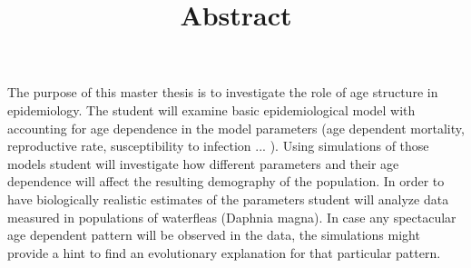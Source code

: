\documentclass{article}
\title{Abstract}
\begin{document}
\maketitle

The purpose of this master thesis is to investigate the role of age structure in epidemiology. The student will examine basic epidemiological model with accounting for age dependence in the model parameters (age dependent mortality, reproductive rate, susceptibility to infection ... ). Using simulations of those models student will investigate how different parameters and their age dependence will affect the resulting demography of the population. In order to have biologically realistic estimates of the parameters student will analyze data measured in populations of waterfleas (Daphnia magna). In case any spectacular age dependent pattern will be observed in the data, the simulations might provide a hint to find an evolutionary explanation for that particular pattern.
\end{document}
